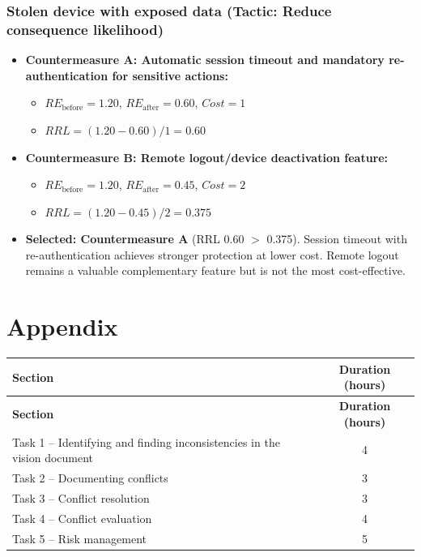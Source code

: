 \documentclass[11pt]{article}
\begin{document}
\subsubsection*{Stolen device with exposed data (Tactic: Reduce consequence likelihood)}
\begin{itemize}[leftmargin=1.5em]
  \item \textbf{Countermeasure A: Automatic session timeout and mandatory re-authentication for sensitive actions:}
  \begin{itemize}[leftmargin=1.5em]
    \item $RE_{\text{before}} = 1.20$, $RE_{\text{after}} = 0.60$, $Cost = 1$
    \item $RRL = (1.20 - 0.60) / 1 = 0.60$
  \end{itemize}
  \item \textbf{Countermeasure B: Remote logout/device deactivation feature:}
  \begin{itemize}[leftmargin=1.5em]
    \item $RE_{\text{before}} = 1.20$, $RE_{\text{after}} = 0.45$, $Cost = 2$
    \item $RRL = (1.20 - 0.45) / 2 = 0.375$
  \end{itemize}
  \item \textbf{Selected: Countermeasure A} (RRL 0.60 $>$ 0.375). Session timeout with re-authentication achieves stronger protection at lower cost. Remote logout remains a valuable complementary feature but is not the most cost-effective.
\end{itemize}


\section{Appendix}

\begin{longtable}{|p{8cm}|c|}
\hline
\textbf{Section} & \textbf{Duration (hours)} \\
\hline
\endfirsthead

\hline
\textbf{Section} & \textbf{Duration (hours)} \\
\hline
\endhead

\hline
\endfoot

\hline
\endlastfoot

Task 1 -- Identifying and finding inconsistencies in the vision document & 4 \\
\hline
Task 2 -- Documenting conflicts & 3 \\
\hline
Task 3 -- Conflict resolution & 3 \\
\hline
Task 4 -- Conflict evaluation & 4 \\
\hline
Task 5 -- Risk management & 5 \\
\hline

\end{longtable}
\end{document}
